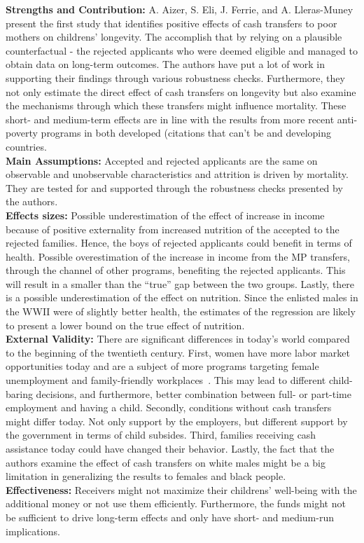 \textbf{Strengths and Contribution:} A. Aizer, S. Eli, J. Ferrie, and A. Lleras-Muney present the first study that identifies positive effects of cash transfers to poor mothers on childrens' longevity. The accomplish that by relying on a plausible counterfactual - the rejected applicants who were deemed eligible and managed to obtain data on long-term outcomes. The authors have put a lot of work in supporting their findings through various robustness checks. Furthermore, they not only estimate the direct effect of cash transfers on longevity but also examine the mechanisms through which these transfers might influence mortality. These short- and medium-term effects are in line with the results from more recent anti-poverty programs in both developed (citations that can't be  and developing~\citep{barham2011healthier,barham2013living} countries.\\
\textbf{Main Assumptions:} Accepted and rejected applicants are the same on observable and unobservable characteristics and attrition is driven by mortality. They are tested for and supported through the robustness checks presented by the authors.   \\
\textbf{Effects sizes:} Possible underestimation of the effect of increase in income because of positive
externality from increased nutrition of the accepted to the rejected families. Hence, the boys of rejected applicants could benefit in terms of health. Possible overestimation of the increase in income from the MP transfers, through the channel of other programs, benefiting the rejected applicants. This will result in a smaller than the ``true'' gap between the two groups. Lastly, there is a possible underestimation of the effect on nutrition. Since the enlisted males in the WWII were of slightly better health, the estimates of the regression are likely to present a lower bound on the true effect of nutrition. \\
\textbf{External Validity:} There are significant differences in today's world compared to the beginning of the twentieth century. First, women have more labor market opportunities today and are a subject of more programs targeting female unemployment and family-friendly workplaces~\citep{lauber2016helping}. This may lead to different child-baring decisions, and furthermore, better combination between full- or part-time employment and having a child. Secondly, conditions without cash transfers might differ today. Not only support by the employers, but different support by the government in terms of child subsides. Third, families receiving cash assistance today could have changed their behavior. Lastly, the fact that the authors examine the effect of cash transfers on white males might be a big limitation in generalizing the results to females and black people.\\   
\textbf{Effectiveness:} Receivers might not maximize their childrens' well-being with the additional money or not use them efficiently. Furthermore, the funds might not be sufficient to drive long-term effects and only have short- and medium-run implications. 